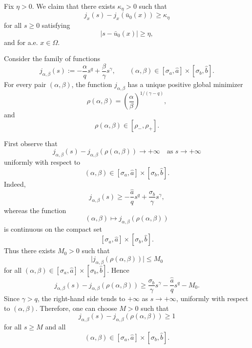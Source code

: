 \documentclass[preprint,11pt]{elsarticle}
\numberwithin{equation}{section}
\begin{document}
Fix \(\eta>0\). We claim that there exists \(\kappa_\eta>0\) such that
\begin{equation}\label{eq:uniform-separation}
	j_x(s)-j_x(\bar u_0(x))
	\ge
	\kappa_\eta
\end{equation}
for all \(s\ge0\) satisfying
\[
|s-\bar u_0(x)|\ge\eta,
\]
and for a.e. \(x\in\Omega\).

Consider the family of functions
\[
j_{\alpha,\beta}(s)
:=
-\frac{\alpha}{q}s^q+\frac{\beta}{\gamma}s^\gamma,
\qquad
(\alpha,\beta)\in[\sigma_a,\hat a]\times[\sigma_b,\hat b].
\]
For every pair \((\alpha,\beta)\), the function \(j_{\alpha,\beta}\) has a
unique positive global minimizer
\[
\rho(\alpha,\beta)
=
\left(\frac{\alpha}{\beta}\right)^{1/(\gamma-q)} ,
\]
and
\[
\rho(\alpha,\beta)\in[\rho_-,\rho_+].
\]

First observe that
\[
j_{\alpha,\beta}(s)-j_{\alpha,\beta}(\rho(\alpha,\beta))
\to+\infty
\quad\text{as }s\to+\infty
\]
uniformly with respect to
\[
(\alpha,\beta)\in[\sigma_a,\hat a]\times[\sigma_b,\hat b].
\]
Indeed,
\[
j_{\alpha,\beta}(s)
\ge
-\frac{\hat a}{q}s^q+\frac{\sigma_b}{\gamma}s^\gamma ,
\]
whereas the function
\[
(\alpha,\beta)
\mapsto
j_{\alpha,\beta}(\rho(\alpha,\beta))
\]
is continuous on the compact set
\[
[\sigma_a,\hat a]\times[\sigma_b,\hat b].
\]
Thus there exists \(M_0>0\) such that
\[
\bigl|j_{\alpha,\beta}(\rho(\alpha,\beta))\bigr|
\le
M_0
\]
for all \((\alpha,\beta)\in[\sigma_a,\hat a]\times[\sigma_b,\hat b]\).
Hence
\[
j_{\alpha,\beta}(s)-j_{\alpha,\beta}(\rho(\alpha,\beta))
\ge
\frac{\sigma_b}{\gamma}s^\gamma
-
\frac{\hat a}{q}s^q
-
M_0 .
\]
Since \(\gamma>q\), the right-hand side tends to \(+\infty\) as
\(s\to+\infty\), uniformly with respect to \((\alpha,\beta)\). Therefore,
one can choose \(M>0\) such that
\begin{equation}\label{eq:large-s-separation}
	j_{\alpha,\beta}(s)-j_{\alpha,\beta}(\rho(\alpha,\beta))
	\ge1
\end{equation}
for all \(s\ge M\) and all
\[
(\alpha,\beta)\in[\sigma_a,\hat a]\times[\sigma_b,\hat b].
\]
\end{document}
